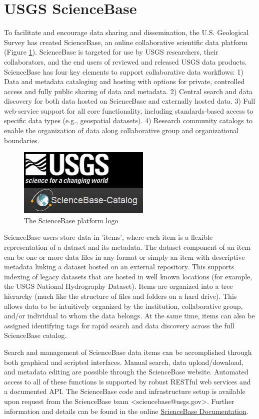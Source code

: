 \section{USGS ScienceBase}

To facilitate and encourage data sharing and dissemination,
the U.S. Geological Survey has created ScienceBase, an online
collaborative scientific data platform (Figure \ref{figure:sbfig}).
ScienceBase is targeted for use by USGS researchers, their collaborators, 
and the end users of reviewed and released USGS data products.
ScienceBase has four key elements to support collaborative
data workflows: 1) Data and metadata
cataloging and hosting with options for private, controlled access
and fully public sharing of data and metadata. 2) Central search and
data discovery for both data hosted on ScienceBase and externally hosted 
data. 3) Full web-service support for all core functionality, including
standards-based access to specific data types (e.g., geospatial
datasets). 4) Research community catalogs to
enable the organization of data along collaborative group and
organizational boundaries.

 \begin{figure}[htbp]
   \centering
   \includegraphics{sblogo}
   \caption{The ScienceBase platform logo}
   \label{figure:sbfig}
 \end{figure}

ScienceBase users store data in 'items', where each item is a flexible
representation of a dataset and its metadata. The dataset component of an
item can be one or more data files in any format or simply an item with descriptive
metadata linking a dataset hosted on an external repository. This supports
indexing of legacy datasets that are hosted in well known locations (for example, 
the USGS National Hydrography Dataset). Items are organized into a tree hierarchy 
(much like the structure of files and
folders on a hard drive). This allows data to be intuitively organized by the
institution, collaborative group, and/or individual to whom
the data belongs. At the same time, items can also be assigned identifying tags
for rapid search and data discovery across the full ScienceBase catalog.

Search and management of ScienceBase data items can be accomplished through
both graphical and scripted interfaces. Manual search, data upload/download, and
metadata editing are possible through the ScienceBase website.
Automated access to all of these functions is supported by robust RESTful web
services and a documented API. The ScienceBase code and infrastructure setup 
is available upon request from the ScienceBase team <sciencebase@usgs.gov>. 
Further information and details can be found in the online 
\href{https://www.sciencebase.gov/about/using-sciencebase}{ScienceBase Documentation}.
